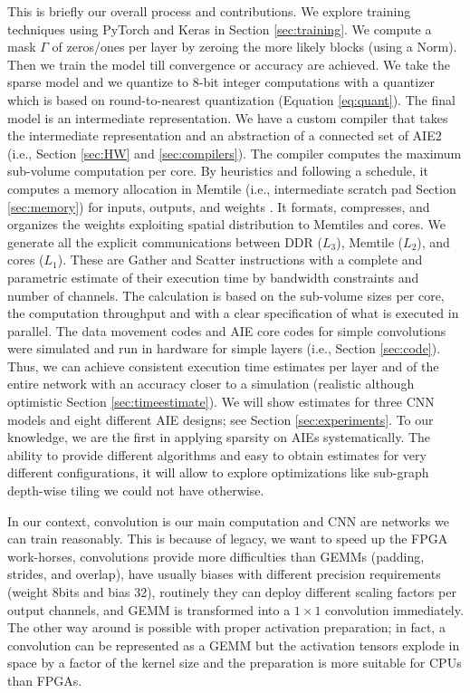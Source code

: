 \documentclass[conference]{IEEEtran}
\begin{document}
This is briefly our overall process and contributions.  We explore
training techniques using PyTorch and Keras in Section
\ref{sec:training}.  We compute a mask $\Gamma$ of zeros/ones per
layer by zeroing the more likely blocks (using a Norm). Then we train
the model till convergence or accuracy are achieved. We take the
sparse model and we quantize to 8-bit integer computations with a
quantizer which is based on round-to-nearest quantization (Equation
\ref{eq:quant}). The final model is an intermediate representation.
We have a custom compiler that takes the intermediate representation
and an abstraction of a connected set of AIE2 (i.e., Section
\ref{sec:HW} and \ref{sec:compilers}).  The compiler computes the
maximum sub-volume computation per core. By heuristics and following a
schedule, it computes a memory allocation in Memtile (i.e.,
intermediate scratch pad Section \ref{sec:memory}) for inputs,
outputs, and weights . It formats, compresses, and organizes the
weights exploiting spatial distribution to Memtiles and cores. We
generate all the explicit communications between DDR ($L_3$), Memtile
($L_2$), and cores ($L_1$). These are Gather and Scatter instructions
with a complete and parametric estimate of their execution time by
bandwidth constraints and number of channels. The calculation is based
on the sub-volume sizes per core, the computation throughput and with
a clear specification of what is executed in parallel. The data
movement codes and AIE core codes for simple convolutions were
simulated and run in hardware for simple layers (i.e., Section
\ref{sec:code}). Thus, we can achieve consistent execution time
estimates per layer and of the entire network with an accuracy closer
to a simulation (realistic although optimistic Section
\ref{sec:timeestimate}).  We will show estimates for three CNN models
and eight different AIE designs; see Section \ref{sec:experiments}.
To our knowledge, we are the first in applying sparsity on AIEs
systematically. The ability to provide different algorithms and easy
to obtain estimates for very different configurations, it will allow
to explore optimizations like sub-graph depth-wise tiling we could not
have otherwise.

In our context, convolution is our main computation and CNN are
networks we can train reasonably. This is because of legacy, we want
to speed up the FPGA work-horses, convolutions provide more
difficulties than GEMMs (padding, strides, and overlap), have usually
biases with different precision requirements (weight 8bits and bias
32), routinely they can deploy different scaling factors per output
channels, and GEMM is transformed into a $1 \times 1$ convolution
immediately. The other way around is possible with proper activation
preparation; in fact, a convolution can be represented as a GEMM but
the activation tensors explode in space by a factor of the kernel size
and the preparation is more suitable for CPUs than FPGAs.
\end{document}
